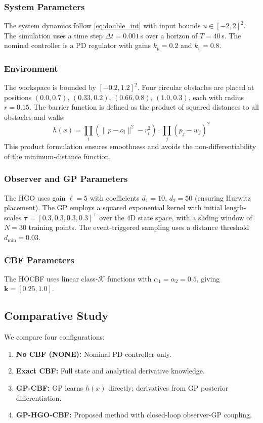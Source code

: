 \documentclass[letterpaper, 10 pt, conference]{ieeeconf}
\begin{document}
\subsubsection{System Parameters}
The system dynamics follow \eqref{eq:double_int} with input bounds $u \in [-2, 2]^2$. The simulation uses a time step $\Delta t = 0.001$\,s over a horizon of $T = 40$\,s. The nominal controller is a PD regulator with gains $k_p = 0.2$ and $k_v = 0.8$.

\subsubsection{Environment}
The workspace is bounded by $[-0.2, 1.2]^2$. Four circular obstacles are placed at positions $(0.0, 0.7)$, $(0.33, 0.2)$, $(0.66, 0.8)$, $(1.0, 0.3)$, each with radius $r = 0.15$. The barrier function is defined as the product of squared distances to all obstacles and walls:
\begin{equation}
    h(x) = \prod_{i} \left(\|p - o_i\|^2 - r_i^2\right) \cdot \prod_{j} (p_j - w_j)^2
\end{equation}
This product formulation ensures smoothness and avoids the non-differentiability of the minimum-distance function.

\subsubsection{Observer and GP Parameters}
The HGO uses gain $\ell = 5$ with coefficients $d_1 = 10$, $d_2 = 50$ (ensuring Hurwitz placement). The GP employs a squared exponential kernel with initial length-scales $\bm{\tau} = [0.3, 0.3, 0.3, 0.3]^\top$ over the 4D state space, with a sliding window of $N = 30$ training points. The event-triggered sampling uses a distance threshold $d_{\min} = 0.03$.

\subsubsection{CBF Parameters}
The HOCBF uses linear class-$\mathcal{K}$ functions with $\alpha_1 = \alpha_2 = 0.5$, giving $\bm{k} = [0.25, 1.0]$.

\subsection{Comparative Study}

We compare four configurations:
\begin{enumerate}
    \item \textbf{No CBF (NONE):} Nominal PD controller only.
    \item \textbf{Exact CBF:} Full state and analytical derivative knowledge.
    \item \textbf{GP-CBF:} GP learns $h(x)$ directly; derivatives from GP posterior differentiation.
    \item \textbf{GP-HGO-CBF:} Proposed method with closed-loop observer-GP coupling.
\end{enumerate}
\end{document}
